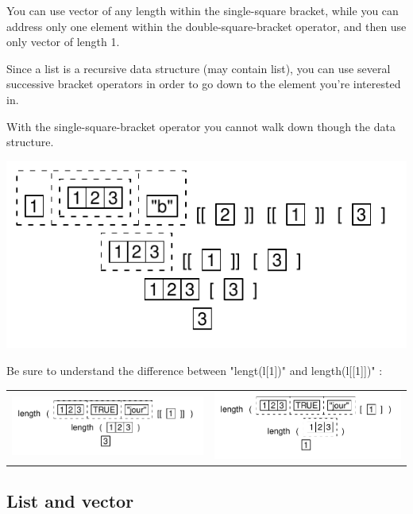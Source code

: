\documentclass[pdflatex]{article}
\begin{document}
You can use vector of any length within the single-square bracket, while you can address only one element within the double-square-bracket operator, and then use only vector of length 1.

Since a list is a recursive data structure (may contain list), you can use several successive bracket operators in order to go down to the element you're interested in.

With the single-square-bracket operator you cannot walk down though the data structure.

\includegraphics{list_successive_extraction}

Be sure to understand the difference between "lengt(l[1])" and length(l[[1]])" :

\begin{tabular}{cc}
\includegraphics{list_extraction_1.pdf} & \includegraphics{list_extraction_2.pdf}
\end{tabular}

\subsection{List and vector}
\end{document}
